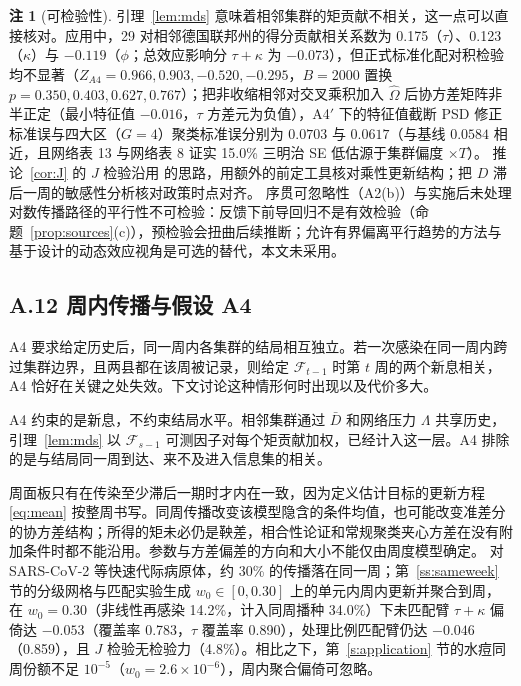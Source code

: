 \documentclass[11pt,a4paper]{ctexart}
\theoremstyle{definition}
\newtheorem{remark}{注}
\newcommand{\F}{\mathcal{F}}
\begin{document}
\begin{remark}[可检验性]
\label{rem:testable}
引理~\ref{lem:mds} 意味着相邻集群的矩贡献不相关，这一点可以直接核对。应用中，29 对相邻德国联邦州的得分贡献相关系数为 0.175（$\tau$）、0.123（$\kappa$）与 $-0.119$（$\phi$；总效应影响分 $\tau+\kappa$ 为 $-0.073$），但正式标准化配对积检验均不显著（$Z_{A4}=0.966, 0.903, -0.520, -0.295$，$B=2000$ 置换 $p=0.350, 0.403, 0.627, 0.767$）；把非收缩相邻对交叉乘积加入 $\hat\Omega$ 后协方差矩阵非半正定（最小特征值 $-0.016$，$\tau$ 方差元为负值），A4$'$ 下的特征值截断 PSD 修正标准误与四大区（$G=4$）聚类标准误分别为 $0.0703$ 与 $0.0617$（与基线 $0.0584$ 相近，且网络表 13 与网络表 8 证实 15.0\% 三明治 SE 低估源于集群偏度 $\times T$）。
推论~\ref{cor:J} 的 $J$ 检验沿用\citet{arellano1991tests} 的思路，用额外的前定工具核对乘性更新结构；把 $D$ 滞后一周的敏感性分析核对政策时点对齐。
序贯可忽略性（A2(b)）与实施后未处理对数传播路径的平行性不可检验：反馈下前导回归不是有效检验（命题~\ref{prop:sources}(c)），预检验会扭曲后续推断\citep{roth2022pretest}；允许有界偏离平行趋势的方法\citep{rambachan2023credible}与基于设计的动态效应视角\citep{bojinov2021panel}是可选的替代，本文未采用。
\end{remark}

\subsection*{A.12 周内传播与假设 A4}
\label{ss:weekwithin}

A4 要求给定历史后，同一周内各集群的结局相互独立。若一次感染在同一周内跨过集群边界，且两县都在该周被记录，则给定 $\F_{t-1}$ 时第 $t$ 周的两个新息相关，A4 恰好在关键之处失效。下文讨论这种情形何时出现以及代价多大。

A4 约束的是新息，不约束结局水平。相邻集群通过 $\bar D$ 和网络压力 $\Lambda$ 共享历史，引理~\ref{lem:mds} 以 $\F_{s-1}$ 可测因子对每个矩贡献加权，已经计入这一层。A4 排除的是与结局同一周到达、来不及进入信息集的相关。

周面板只有在传染至少滞后一期时才内在一致，因为定义估计目标的更新方程 \eqref{eq:mean} 按整周书写。同周传播改变该模型隐含的条件均值，也可能改变准差分的协方差结构；所得的矩未必仍是鞅差，相合性论证和常规聚类夹心方差在没有附加条件时都不能沿用。参数与方差偏差的方向和大小不能仅由周度模型确定。
对 SARS-CoV-2 等快速代际病原体，约 30\% 的传播落在同一周；第~\ref{ss:sameweek} 节的分级网格与匹配实验生成 $w_0\in[0,0.30]$ 上的单元内周内更新并聚合到周，在 $w_0=0.30$（非线性再感染 14.2\%，计入同周播种 34.0\%）下未匹配臂 $\tau+\kappa$ 偏倚达 $-0.053$（覆盖率 0.783，$\tau$ 覆盖率 0.890），处理比例匹配臂仍达 $-0.046$（0.859），且 $J$ 检验无检验力（4.8\%）。相比之下，第~\ref{s:application} 节的水痘同周份额不足 $10^{-5}$（$w_0=2.6\times 10^{-6}$），周内聚合偏倚可忽略。
\end{document}
